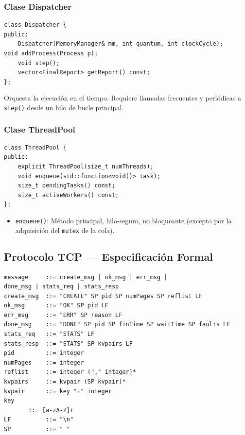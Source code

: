 \documentclass[12pt,letterpaper]{article}
\begin{document}
\subsubsection{Clase Dispatcher}
\begin{tcolorbox}[codebox, title={Sinopsis}]
\begin{lstlisting}
class Dispatcher {
public:
    Dispatcher(MemoryManager& mm, int quantum, int clockCycle);
void addProcess(Process p);
    void step();
    vector<FinalReport> getReport() const;
};
\end{lstlisting}
\end{tcolorbox}
Orquesta la ejecución en el tiempo.
Requiere llamadas frecuentes y periódicas a \texttt{step()} desde un hilo de bucle principal.
\subsubsection{Clase ThreadPool}
\begin{tcolorbox}[codebox, title={Sinopsis}]
\begin{lstlisting}
class ThreadPool {
public:
    explicit ThreadPool(size_t numThreads);
    void enqueue(std::function<void()> task);
    size_t pendingTasks() const;
    size_t activeWorkers() const;
};
\end{lstlisting}
\end{tcolorbox}
\begin{itemize}
    \item \texttt{enqueue()}: Método principal, hilo-seguro, no bloqueante (excepto por la adquisición del \texttt{mutex} de la cola).
\end{itemize}

\subsection{Protocolo TCP --- Especificación Formal}

\begin{tcolorbox}[codebox, title={Gramática BNF del Protocolo}]
\begin{lstlisting}
message     ::= create_msg | ok_msg | err_msg |
done_msg | stats_req | stats_resp
create_msg  ::= "CREATE" SP pid SP numPages SP reflist LF
ok_msg      ::= "OK" SP pid LF
err_msg     ::= "ERR" SP reason LF
done_msg    ::= "DONE" SP pid SP finTime SP waitTime SP faults LF
stats_req   ::= "STATS" LF
stats_resp  ::= "STATS" SP kvpairs LF
pid         ::= integer
numPages    ::= integer
reflist     ::= integer ("," integer)*
kvpairs     ::= kvpair (SP kvpair)*
kvpair      ::= key "=" integer
key
       ::= [a-zA-Z]+
LF          ::= "\n"
SP          ::= " "
\end{lstlisting}
\end{tcolorbox}
\end{document}
